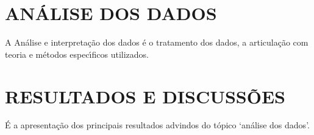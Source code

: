 \chapter{AN\'{A}LISE DOS DADOS}

A An\'{a}lise e interpreta\c{c}\~{a}o dos dados \'{e} o tratamento dos dados, a articula\c{c}\~{a}o com teoria e m\'{e}todos espec\'{\i}ficos utilizados.\cite{Cover2006}

\resetlinenumber
\chapter{RESULTADOS E DISCUSS\~{O}ES }

\'{E} a apresenta\c{c}\~{a}o dos principais resultados advindos do t\'{o}pico ‘an\'{a}lise dos dados’.\cite{Feynman1998}
